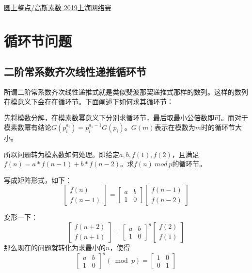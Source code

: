 \href{https://nanti.jisuanke.com/t/41421}{圆上整点/高斯素数 \quad 2019上海网络赛}








\section{循环节问题}
\subsection{二阶常系数齐次线性递推循环节}
所谓二阶常系数齐次线性递推式就是类似斐波那契递推式那样的数列。这样的数列在模意义下会存在循环节。下面阐述下如何求其循环节：


先将模数分解，在模素数幂意义下分别求循环节，最后取最小公倍数即可。而对于模素数幂有结论$G(p_i^{a_i}) = p_i^{a_1-1}G(p_i)$。$G(m)$表示在模数为$m$时的循环节大小。

所以问题转为模素数如何处理。即给定$a,b,f(1),f(2)$，且满足$f(n)=a*f(n-1) + b*f(n-2)$。求$f(n)\ mod\ p$的循环节。

写成矩阵形式，如下：
$$
\left[\begin{array}{c}{f(n)} \\ {f(n-1)}\end{array}\right]=\left[\begin{array}{cc}{a} & {b} \\ {1} & {0}\end{array}\right]\left[\begin{array}{c}{f(n-1)} \\ {f(n-2)}\end{array}\right]
$$

变形一下：
$$
\left[\begin{array}{c}{f(n+2)} \\ {f(n+1)}\end{array}\right]=\left[\begin{array}{cc}{a} & {b} \\ {1} & {0}\end{array}\right]^{n}\left[\begin{array}{c}{f(2)} \\ {f(1)}\end{array}\right]
$$
那么现在的问题就转化为求最小的$n$，使得
$$
\left[\begin{array}{ll}{a} & {b} \\ {1} & {0}\end{array}\right]^{n}(\bmod p)=\left[\begin{array}{ll}{1} & {0} \\ {0} & {1}\end{array}\right]
$$

